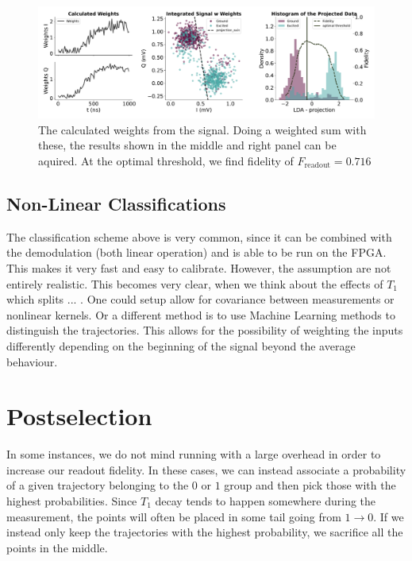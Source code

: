 \begin{figure}
    \centering
    \includegraphics{Readout/Figs/Weighted.pdf}
    \caption{The calculated weights from the signal. Doing a weighted sum with these, the results shown in the middle and right panel can be aquired. At the optimal threshold, we find fidelity of $F_{\text{readout}} = 0.716$}
    \label{fig:matched_weights_fidelty}
\end{figure}


\subsection{Non-Linear Classifications}
The classification scheme above is very common, since it can be combined with the demodulation (both linear operation) and is able to be run on the FPGA. This makes it very fast and easy to calibrate. However, the assumption are not entirely realistic. This becomes very clear, when we think about the effects of $T_1$ which splits ... . One could setup allow for covariance between measurements or nonlinear kernels. Or a different method is to use Machine Learning methods to distinguish the trajectories. This allows for the possibility of weighting the inputs differently depending on the beginning of the signal beyond the average behaviour.



\section{Postselection}
In some instances, we do not mind running with a large overhead in order to increase our readout fidelity. In these cases, we can instead associate a probability of a given trajectory belonging to the $0$ or $1$ group and then pick those with the highest probabilities. Since $T_1$ decay tends to happen somewhere during the measurement, the points will often be placed in some tail going from $1 \to 0$. If we instead only keep the trajectories with the highest probability, we sacrifice all the points in the middle.

